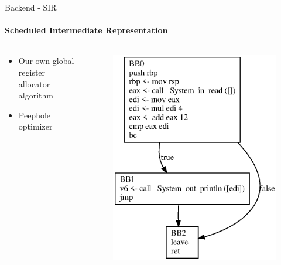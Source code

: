\documentclass[en,16:9]{sdqbeamer}
\begin{document}
\begin{frame}{Backend - SIR}
	\framesubtitle{Scheduled Intermediate Representation}
	
	\begin{columns}
		\begin{column}{0.5\textwidth}
			\begin{itemize}
				\item Our own global register allocator algorithm
				\item Peephole optimizer
			\end{itemize}
		\end{column}

		\begin{column}{0.5\textwidth}
			\begin{figure}
				\centering
				\includegraphics[scale=0.5]{images/sir-after-reg-alloc}
			\end{figure}
		\end{column}
	\end{columns}
\end{frame}
\end{document}

